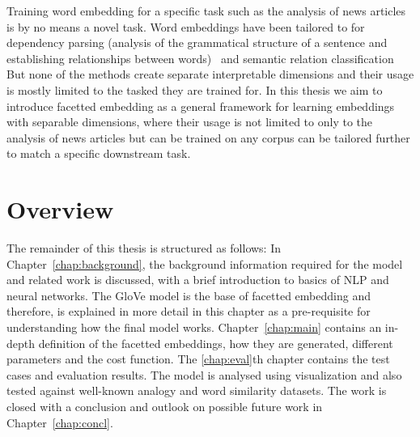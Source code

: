 Training word embedding for a specific task such as the analysis of news articles is by no means a novel task. Word embeddings have been tailored to for dependency parsing (analysis of the grammatical structure of a sentence and establishing relationships between words)~ and semantic relation classification  But none of the methods create separate interpretable dimensions and their usage is mostly limited to the tasked they are trained for. In this thesis we aim to introduce facetted embedding as a general framework for learning embeddings with separable dimensions, where their usage is not limited to only to the analysis of news articles but can be trained on any corpus can be tailored further to match a specific downstream task. 
\section{Overview}

The remainder of this thesis is structured as follows: In Chapter~\ref{chap:background}, the background information required for the model and related work is discussed, with a brief introduction to basics of NLP and neural networks. The GloVe model is the base of facetted embedding and therefore, is explained in more detail in this chapter as a pre-requisite for understanding how the final model works. Chapter~\ref{chap:main} contains an in-depth definition of the facetted embeddings, how they are generated, different parameters and the cost function. The \ref{chap:eval}th chapter contains the test cases and evaluation results. The model is analysed using visualization and also tested against well-known analogy and word similarity datasets. The work is closed with a conclusion and outlook on possible future work in Chapter~\ref{chap:concl}. 
